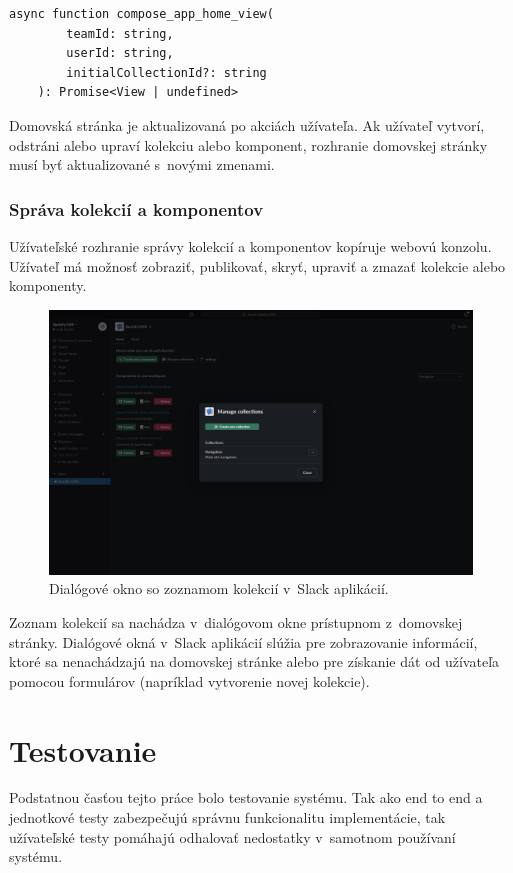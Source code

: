 \begin{lstlisting}[caption={Funkcia zodpovedná za generovanie rozhrania domovskej stránky.}]
	async function compose_app_home_view(
		teamId: string,
		userId: string,
		initialCollectionId?: string
	): Promise<View | undefined>
\end{lstlisting}

\medskip

\noindent Domovská stránka je aktualizovaná po akciách užívateľa. Ak užívateľ vytvorí, odstráni alebo upraví kolekciu alebo komponent, rozhranie domovskej stránky musí byť aktualizované s~novými zmenami.

\subsection{Správa kolekcií a komponentov}
Užívateľské rozhranie správy kolekcií a komponentov kopíruje webovú konzolu. Užívateľ má možnosť zobraziť, publikovať, skryť, upraviť a zmazať kolekcie alebo komponenty.

\begin{figure}[h]
	\centering
	\includegraphics[scale=0.085]{obrazky-figures/screenshot_slack_collections}
	\caption{Dialógové okno so zoznamom kolekcií v~Slack aplikácií.}
\end{figure}

\noindent Zoznam kolekcií sa nachádza v~dialógovom okne prístupnom z~domovskej stránky. Dialógové okná v~Slack aplikácií slúžia pre zobrazovanie informácií, ktoré sa nenachádzajú na domovskej stránke alebo pre získanie dát od užívateľa pomocou formulárov (napríklad vytvorenie novej kolekcie).

\chapter{Testovanie}
\label{test}
Podstatnou časťou tejto práce bolo testovanie systému. Tak ako end to end a jednotkové testy zabezpečujú správnu funkcionalitu implementácie, tak užívateľské testy pomáhajú odhalovať nedostatky v~samotnom používaní systému.

